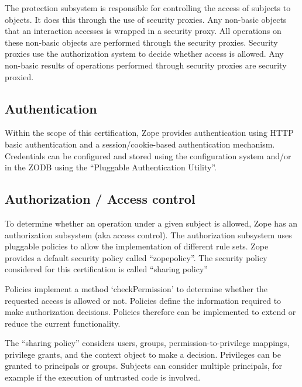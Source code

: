 \documentclass[12pt,english]{scrbook}
\begin{document}
The protection subsystem is responsible for controlling the access of subjects
to objects.  It does this through the use of security proxies.  Any non-basic
objects that an interaction accesses is wrapped in a security proxy.  All
operations on these non-basic objects are performed through the security
proxies. Security proxies use the authorization system to decide whether access
is allowed.  Any non-basic results of operations performed through security
proxies are security proxied.




\subsection{Authentication}

Within the scope of this certification, Zope provides authentication using
HTTP basic authentication and a session/cookie-based authentication mechanism.
Credentials can be configured and stored using the configuration system and/or
in the ZODB using the ``Pluggable Authentication Utility''.




\subsection{Authorization / Access control}

To determine whether an operation under a given subject is allowed, Zope has an
authorization subsystem (aka access control). The authorization subsystem uses
pluggable policies to allow the implementation of different rule sets. Zope
provides a default security policy called ``zopepolicy''. The security policy
considered for this certification is called ``sharing policy''

Policies implement a method `checkPermission' to determine whether the
requested access is allowed or not. Policies define the information required to
make authorization decisions.  Policies therefore can be implemented to extend
or reduce the current functionality.

The ``sharing policy'' considers users, groups, permission-to-privilege
mappings, privilege grants, and the context object to make a decision.
Privileges can be granted to principals or groups.  Subjects can consider
multiple principals, for example if the execution of untrusted code is
involved.
\end{document}
